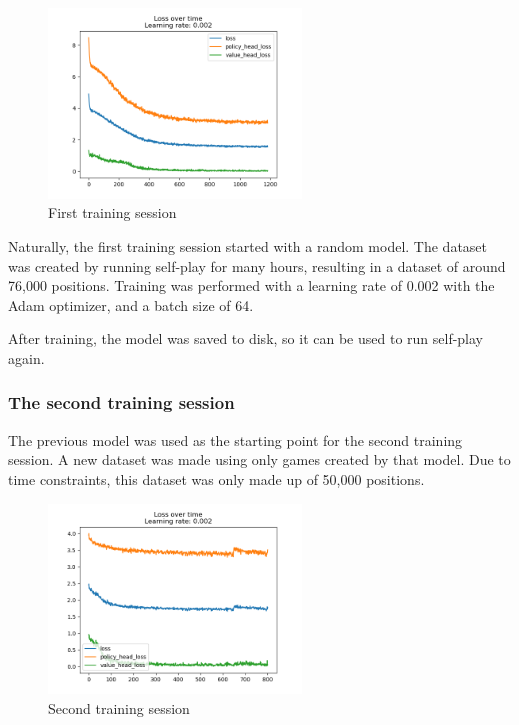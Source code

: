 \documentclass{article}
\begin{document}
\begin{figure}[H]
    \centering
    \includegraphics[width=0.6\textwidth]{img/plots/first-training.png}
    \caption{First training session}
\end{figure}

Naturally, the first training session started with a random model. 
The dataset was created by running self-play for many hours, resulting in a dataset of around
76,000 positions. Training was performed with a learning rate of 0.002 with the Adam optimizer, 
and a batch size of 64.

After training, the model was saved to disk, so it can be used to run self-play again.

\subsubsection{The second training session}

The previous model was used as the starting point for the second training session.
A new dataset was made using only games created by that model. 
Due to time constraints, this dataset was only made up of 50,000 positions.

\begin{figure}[H]
    \centering
    \includegraphics[width=0.6\textwidth]{img/plots/second-training.png}
    \caption{Second training session}
\end{figure}
\end{document}
